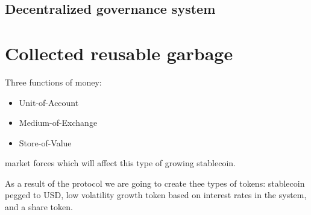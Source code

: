 \documentclass[12pt, a4paper, twocolumn]{article}
\begin{document}
 \subsection{Decentralized governance system}
 
 
  \section{Collected reusable garbage}
 
Three functions of money:
 \begin{itemize}
\item Unit-of-Account
\item Medium-of-Exchange
\item Store-of-Value
\end{itemize}



market forces which will affect this type of growing stablecoin.
 
As a result of the protocol we are going to create thee types of tokens: stablecoin pegged to USD, low volatility growth token based on interest rates in the system, and a share token. 
  




\end{document}
